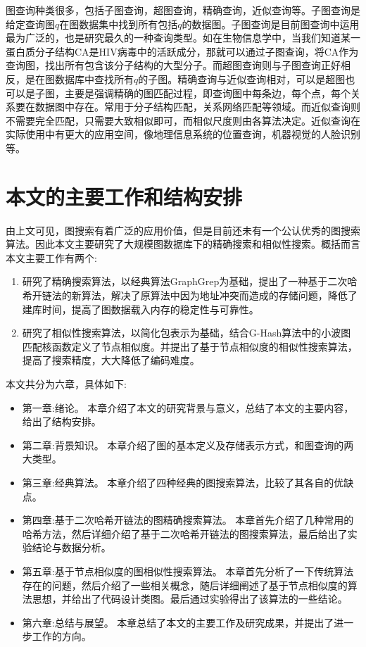 \documentclass{XDBAthesis}
\begin{document}
图查询种类很多，包括子图查询，超图查询，精确查询，近似查询等\cite{g13}。子图查询是给定查询图$q$在图数据集中找到所有包括$q$的数据图。子图查询是目前图查询中运用最为广泛的，也是研究最久的一种查询类型。如在生物信息学中\cite{g13}，当我们知道某一蛋白质分子结构CA是HIV病毒中的活跃成分，那就可以通过子图查询，将CA作为查询图，找出所有包含该分子结构的大型分子。而超图查询则与子图查询正好相反，是在图数据库中查找所有$q$的子图。精确查询与近似查询相对，可以是超图也可以是子图，主要是强调精确的图匹配过程，即查询图中每条边，每个点，每个关系要在数据图中存在。常用于分子结构匹配，关系网络匹配等领域。而近似查询则不需要完全匹配，只需要大致相似即可，而相似尺度则由各算法决定。近似查询在实际使用中有更大的应用空间，像地理信息系统的位置查询，机器视觉的人脸识别等。

\section{本文的主要工作和结构安排}
由上文可见，图搜索有着广泛的应用价值，但是目前还未有一个公认优秀的图搜索算法。因此本文主要研究了大规模图数据库下的精确搜索和相似性搜索。概括而言本文主要工作有两个:
\begin{enumerate}
    \item 研究了精确搜索算法，以经典算法GraphGrep\cite{graphgrep}为基础，提出了一种基于二次哈希开链法的新算法，解决了原算法中因为地址冲突而造成的存储问题，降低了建库时间，提高了图数据载入内存的稳定性与可靠性。
    \item 研究了相似性搜索算法，以简化包表示为基础，结合G-Hash\cite{ghash}算法中的小波图匹配核函数定义了节点相似度。并提出了基于节点相似度的相似性搜索算法，提高了搜索精度，大大降低了编码难度。
\end{enumerate}
本文共分为六章，具体如下:
\begin{itemize}
    \item 第一章:绪论。 本章介绍了本文的研究背景与意义，总结了本文的主要内容，给出了结构安排。
    \item 第二章:背景知识。 本章介绍了图的基本定义及存储表示方式，和图查询的两大类型。
    \item 第三章:经典算法。 本章介绍了四种经典的图搜索算法，比较了其各自的优缺点。
    \item 第四章:基于二次哈希开链法的图精确搜索算法。 本章首先介绍了几种常用的哈希方法，然后详细介绍了基于二次哈希开链法的图搜索算法，最后给出了实验结论与数据分析。
    \item 第五章:基于节点相似度的图相似性搜索算法。 本章首先分析了一下传统算法存在的问题，然后介绍了一些相关概念，随后详细阐述了基于节点相似度的算法思想，并给出了代码设计类图。最后通过实验得出了该算法的一些结论。
    \item 第六章:总结与展望。 本章总结了本文的主要工作及研究成果，并提出了进一步工作的方向。
\end{itemize}



\ifx\allfiles\undefined
\renewcommand\refname{参考文献}
%

\end{document}
